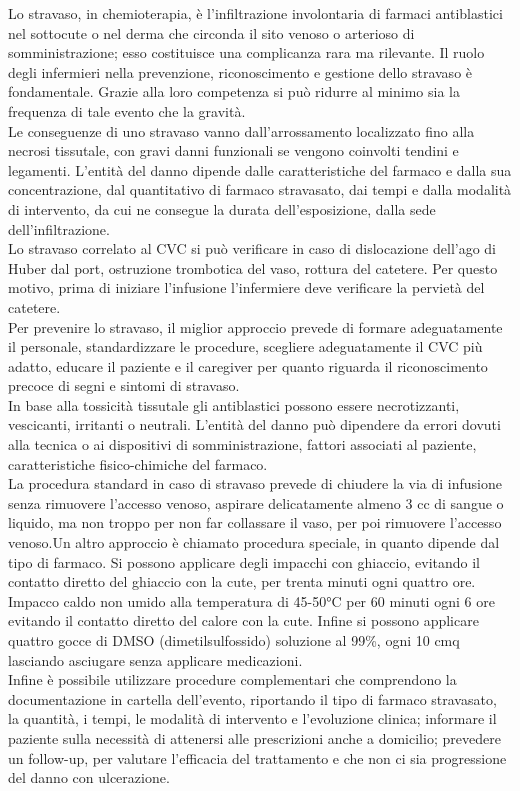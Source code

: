 Lo stravaso, in chemioterapia, è l’infiltrazione involontaria di farmaci antiblastici nel sottocute o nel derma che 
circonda il sito venoso o arterioso di somministrazione; esso costituisce una complicanza rara ma rilevante.
Il ruolo degli infermieri nella prevenzione, riconoscimento e gestione dello stravaso è fondamentale. Grazie alla 
loro competenza si può ridurre al minimo sia la frequenza di tale evento che la gravità.\\ Le conseguenze di uno 
stravaso vanno dall’arrossamento localizzato fino alla necrosi tissutale, con gravi danni funzionali se vengono 
coinvolti  tendini e legamenti. L’entità del danno dipende dalle caratteristiche del farmaco e dalla sua 
concentrazione, dal quantitativo di farmaco stravasato, dai tempi e dalla modalità di intervento, da cui ne consegue 
la durata dell’esposizione, dalla sede dell’infiltrazione.\\
Lo stravaso correlato al CVC si può verificare in caso di dislocazione dell’ago di Huber dal port, ostruzione 
trombotica del vaso, rottura del catetere. Per questo motivo, prima di iniziare l’infusione l’infermiere deve 
verificare la pervietà del catetere.\\
Per prevenire lo stravaso, il miglior approccio prevede di formare adeguatamente il personale, standardizzare le 
procedure, scegliere adeguatamente il CVC più adatto, educare il paziente e il caregiver per quanto riguarda il 
riconoscimento precoce di segni e sintomi di stravaso\cite{AIOMCVC}.\\ 
In base alla tossicità tissutale gli antiblastici possono essere necrotizzanti, vescicanti, irritanti o neutrali.
L’entità del danno può dipendere da errori dovuti alla tecnica o ai dispositivi di somministrazione, 
fattori associati al paziente, caratteristiche fisico-chimiche del farmaco.\\ %
La procedura standard in caso di stravaso prevede di chiudere la via di infusione senza rimuovere l’accesso venoso, 
aspirare delicatamente almeno 3 cc di sangue o liquido, ma non troppo per non far collassare il vaso, per poi 
rimuovere l’accesso venoso.Un altro approccio è chiamato procedura speciale, in quanto dipende dal tipo di farmaco. 
Si possono applicare degli impacchi con ghiaccio, evitando il contatto diretto del ghiaccio con la cute, per trenta 
minuti ogni quattro ore. Impacco caldo non umido alla temperatura di 45-50°C per 60 minuti ogni 6 ore evitando il 
contatto diretto del calore con la cute. Infine si possono applicare quattro gocce di DMSO (dimetilsulfossido) 
soluzione al 99\%, ogni 10 cmq lasciando asciugare senza applicare medicazioni.\\ 
Infine è possibile utilizzare procedure complementari che comprendono la documentazione in cartella dell’evento, 
riportando il tipo di farmaco stravasato, la quantità, i tempi, le modalità di intervento e l’evoluzione clinica; 
informare il paziente sulla necessità di attenersi alle prescrizioni anche a domicilio; prevedere un follow-up, 
per valutare l'efficacia del trattamento e che non ci sia progressione del danno con ulcerazione.\\ %


